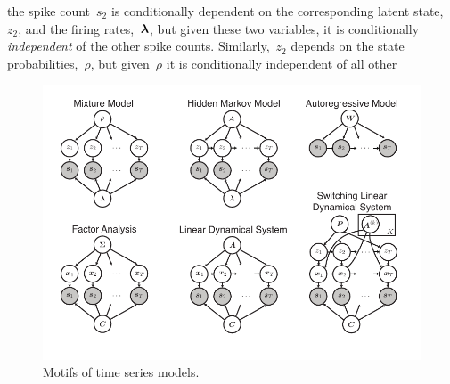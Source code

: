 the spike count~$s_2$ is conditionally 
dependent on the corresponding latent state,~$z_2$, and the firing rates,~$\boldsymbol{\lambda}$, 
but given these two variables, it is conditionally \emph{independent} of 
the other spike counts. Similarly,~$z_2$ depends on the state probabilities,~$\rho$,
but given~$\rho$ it is conditionally independent of all other 

\begin{figure}[t]
\centering%
\includegraphics[width=5.5in]{figures/ch1/figure2} 
\vspace{-.25in}
\caption[Motifs of time series models]{Motifs of time series models.}
\label{fig:motifs}
\end{figure}


